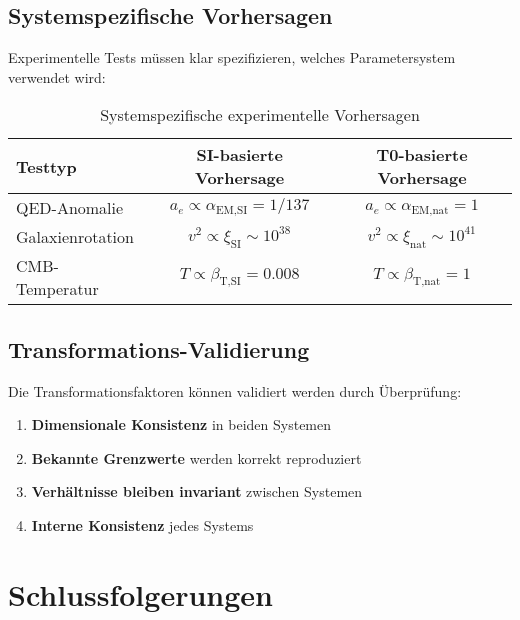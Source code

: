 \documentclass[12pt,a4paper]{article}
\newcommand{\xipar}{\xi}
\newcommand{\alphaEMSI}{\alpha_{\text{EM,SI}}}
\newcommand{\alphaEMnat}{\alpha_{\text{EM,nat}}}
\newcommand{\betaTSI}{\beta_{\text{T,SI}}}
\newcommand{\betaTnat}{\beta_{\text{T,nat}}}
\begin{document}
	\subsection{Systemspezifische Vorhersagen}
	\label{subsec:systemspezifische_vorhersagen}
	
	Experimentelle Tests müssen klar spezifizieren, welches Parametersystem verwendet wird:
	
	\begin{table}[htbp]
		\centering
		\begin{tabular}{lcc}
			\toprule
			\textbf{Testtyp} & \textbf{SI-basierte Vorhersage} & \textbf{T0-basierte Vorhersage} \\
			\midrule
			QED-Anomalie & $a_e \propto \alphaEMSI = 1/137$ & $a_e \propto \alphaEMnat = 1$ \\
			Galaxienrotation & $v^2 \propto \xipar_{\text{SI}} \sim 10^{38}$ & $v^2 \propto \xipar_{\text{nat}} \sim 10^{41}$ \\
			CMB-Temperatur & $T \propto \betaTSI = 0.008$ & $T \propto \betaTnat = 1$ \\
			\bottomrule
		\end{tabular}
		\caption{Systemspezifische experimentelle Vorhersagen}
		\label{tab:system_vorhersagen}
	\end{table}
	
	\subsection{Transformations-Validierung}
	\label{subsec:transformations_validierung}
	
	Die Transformationsfaktoren können validiert werden durch Überprüfung:
	
	\begin{enumerate}
		\item \textbf{Dimensionale Konsistenz} in beiden Systemen
		\item \textbf{Bekannte Grenzwerte} werden korrekt reproduziert
		\item \textbf{Verhältnisse bleiben invariant} zwischen Systemen
		\item \textbf{Interne Konsistenz} jedes Systems
	\end{enumerate}
	
	\section{Schlussfolgerungen}
	\label{sec:schlussfolgerungen}
	
\end{document}
